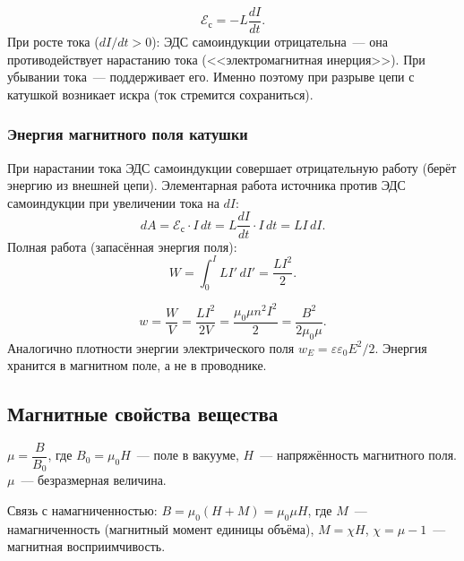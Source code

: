 \documentclass[12pt]{article}
\begin{document}
\begin{definition}
    \[
        \mathcal{E}_{\text{с}} = -L\frac{dI}{dt}.
    \]
    При росте тока ($dI/dt > 0$): ЭДС самоиндукции отрицательна~--- она
    противодействует нарастанию тока (<<электромагнитная инерция>>). При
    убывании тока~--- поддерживает его. Именно поэтому при разрыве цепи с
    катушкой возникает искра (ток стремится сохраниться).
\end{definition}

\subsubsection{Энергия магнитного поля катушки}

\begin{definition}
    При нарастании тока ЭДС самоиндукции совершает отрицательную работу (берёт
    энергию из внешней цепи). Элементарная работа источника против ЭДС
    самоиндукции при увеличении тока на $dI$:
    \[
        dA = \mathcal{E}_{\text{с}} \cdot I \, dt = L\frac{dI}{dt}\cdot I\,dt =
        LI\,dI.
    \]
    Полная работа (запасённая энергия поля):
    \[
        W = \int_0^I LI'\,dI' = \frac{LI^2}{2}.
    \]
\end{definition}

\begin{definition}
    \[
        w = \frac{W}{V} = \frac{LI^2}{2V} = \frac{\mu_0\mu n^2 I^2}{2}
        = \frac{B^2}{2\mu_0\mu}.
    \]
    Аналогично плотности энергии электрического поля $w_E = \varepsilon\varepsilon_0 E^2/2$.
    Энергия хранится в магнитном поле, а не в проводнике.
\end{definition}

\subsection{Магнитные свойства вещества}

\begin{definition}
    $\mu = \dfrac{B}{B_0}$, где $B_0 = \mu_0 H$~--- поле в вакууме, $H$~---
    напряжённость магнитного поля. $\mu$~--- безразмерная величина.

    Связь с намагниченностью: $B = \mu_0(H + M) = \mu_0\mu H$, где $M$~---
    намагниченность (магнитный момент единицы объёма), $M = \chi H$,
    $\chi = \mu - 1$~--- магнитная восприимчивость.
\end{definition}
\end{document}
